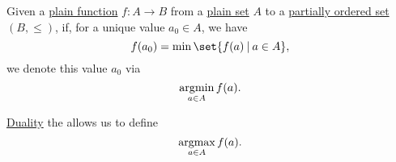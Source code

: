 \begin{definition}\label{def:argmin_argmax}
  Given a \hyperref[def:function]{plain function} \( f: A \to B \) from a \hyperref[def:set]{plain set} \( A \) to a \hyperref[def:partially_ordered_set]{partially ordered set} \( (B, \leq) \), if, for a unique value \( a_0 \in A \), we have
  \begin{equation*}
    f(a_0) = \min\set{ f(a) \given a \in A },
  \end{equation*}
  we denote this value \( a_0 \) via
  \begin{equation*}
    \operatorname*{argmin}_{a \in A} f(a).
  \end{equation*}

  \hyperref[thm:preorder_duality]{Duality} the allows us to define
  \begin{equation*}
    \operatorname*{argmax}_{a \in A} f(a).
  \end{equation*}
\end{definition}

